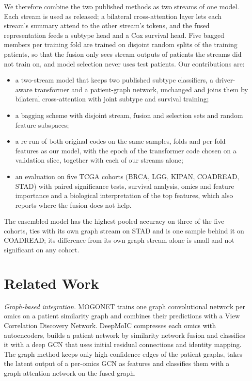 \documentclass[conference]{IEEEtran}
\begin{document}
We therefore combine the two published methods as two streams of one model. Each stream is used as released; a
bilateral cross-attention layer lets each stream's summary attend to the other stream's tokens, and the fused
representation feeds a subtype head and a Cox survival head. Five bagged members per training fold are trained on
disjoint random splits of the training patients, so that the fusion only sees stream outputs of patients the streams
did not train on, and model selection never uses test patients. Our contributions are:
\begin{itemize}
\item a two-stream model that keeps two published subtype classifiers, a driver-aware transformer and a
patient-graph network, unchanged and joins them by bilateral cross-attention with joint subtype and survival training;
\item a bagging scheme with disjoint stream, fusion and selection sets and random feature subspaces;
\item a re-run of both original codes on the same samples, folds and per-fold features as our model, with the epoch of
the transformer code chosen on a validation slice, together with each of our streams alone;
\item an evaluation on five TCGA cohorts (BRCA, LGG, KIPAN, COADREAD, STAD) with paired significance tests, survival
analysis, omics and feature importance and a biological interpretation of the top features, which also reports where
the fusion does not help.
\end{itemize}
The ensembled model has the highest pooled accuracy on three of the five cohorts, ties with its own graph stream on
STAD and is one sample behind it on COADREAD; its difference from its own graph stream alone is small and not
significant on any cohort.

\section{Related Work}
\emph{Graph-based integration.} MOGONET \cite{wang2021mogonet} trains one graph convolutional network
\cite{kipf2017gcn} per omics on a patient similarity graph and combines their predictions with a View Correlation
Discovery Network. DeepMoIC \cite{wu2024deepmoic} compresses each omics with autoencoders, builds a patient network by
similarity network fusion \cite{wang2014snf} and classifies it with a deep GCN that uses initial residual connections and
identity mapping. The graph method \cite{dou2025mogcan} keeps only high-confidence edges of the patient graphs, takes the
latent output of a per-omics GCN as features and classifies them with a graph attention network
\cite{velickovic2018gat} on the fused graph.
\end{document}
